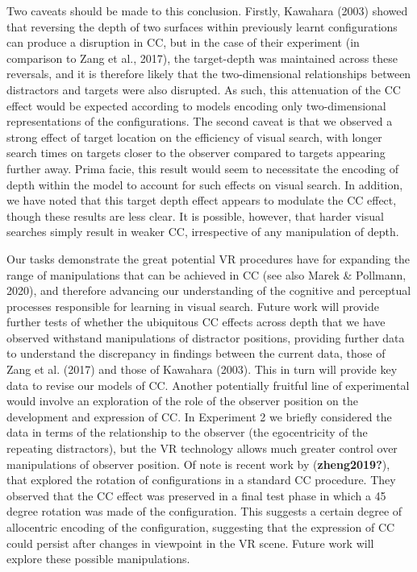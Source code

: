\documentclass[
  english,
  man,floatsintext]{apa7}
\begin{document}
Two caveats should be made to this conclusion. Firstly, Kawahara (2003) showed that reversing the depth of two surfaces within previously learnt configurations can produce a disruption in CC, but in the case of their experiment (in comparison to Zang et al., 2017), the target-depth was maintained across these reversals, and it is therefore likely that the two-dimensional relationships between distractors and targets were also disrupted. As such, this attenuation of the CC effect would be expected according to models encoding only two-dimensional representations of the configurations. The second caveat is that we observed a strong effect of target location on the efficiency of visual search, with longer search times on targets closer to the observer compared to targets appearing further away. Prima facie, this result would seem to necessitate the encoding of depth within the model to account for such effects on visual search. In addition, we have noted that this target depth effect appears to modulate the CC effect, though these results are less clear. It is possible, however, that harder visual searches simply result in weaker CC, irrespective of any manipulation of depth.

Our tasks demonstrate the great potential VR procedures have for expanding the range of manipulations that can be achieved in CC (see also Marek \& Pollmann, 2020), and therefore advancing our understanding of the cognitive and perceptual processes responsible for learning in visual search. Future work will provide further tests of whether the ubiquitous CC effects across depth that we have observed withstand manipulations of distractor positions, providing further data to understand the discrepancy in findings between the current data, those of Zang et al. (2017) and those of Kawahara (2003). This in turn will provide key data to revise our models of CC. Another potentially fruitful line of experimental would involve an exploration of the role of the observer position on the development and expression of CC. In Experiment 2 we briefly considered the data in terms of the relationship to the observer (the egocentricity of the repeating distractors), but the VR technology allows much greater control over manipulations of observer position. Of note is recent work by (\textbf{zheng2019?}), that explored the rotation of configurations in a standard CC procedure. They observed that the CC effect was preserved in a final test phase in which a 45 degree rotation was made of the configuration. This suggests a certain degree of allocentric encoding of the configuration, suggesting that the expression of CC could persist after changes in viewpoint in the VR scene. Future work will explore these possible manipulations.
\end{document}
